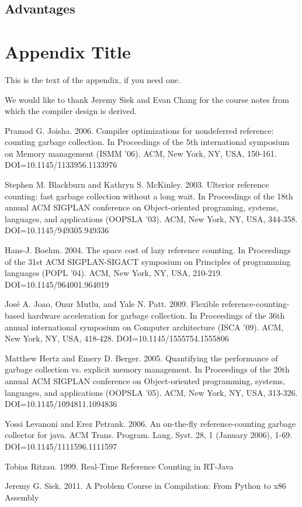 \documentclass{sigplanconf}
\begin{document}
\subsection{Advantages}

\appendix
\section{Appendix Title}

This is the text of the appendix, if you need one.

\acks

We would like to thank Jeremy Siek and Evan Chang for the course notes from which the compiler design is derived.





\begin{thebibliography}{}
\softraggedright
{}
Pramod G. Joisha. 2006. Compiler optimizations for nondeferred reference: counting garbage collection. In Proceedings of the 5th international symposium on Memory management (ISMM '06). ACM, New York, NY, USA, 150-161. DOI=10.1145/1133956.1133976

Stephen M. Blackburn and Kathryn S. McKinley. 2003. Ulterior reference counting: fast garbage collection without a long wait. In Proceedings of the 18th annual ACM SIGPLAN conference on Object-oriented programing, systems, languages, and applications (OOPSLA '03). ACM, New York, NY, USA, 344-358. DOI=10.1145/949305.949336

Hans-J. Boehm. 2004. The space cost of lazy reference counting. In Proceedings of the 31st ACM SIGPLAN-SIGACT symposium on Principles of programming languages (POPL '04). ACM, New York, NY, USA, 210-219. DOI=10.1145/964001.964019 

José A. Joao, Onur Mutlu, and Yale N. Patt. 2009. Flexible reference-counting-based hardware acceleration for garbage collection. In Proceedings of the 36th annual international symposium on Computer architecture (ISCA '09). ACM, New York, NY, USA, 418-428. DOI=10.1145/1555754.1555806

Matthew Hertz and Emery D. Berger. 2005. Quantifying the performance of garbage collection vs. explicit memory management. In Proceedings of the 20th annual ACM SIGPLAN conference on Object-oriented programming, systems, languages, and applications (OOPSLA '05). ACM, New York, NY, USA, 313-326. DOI=10.1145/1094811.1094836  

Yossi Levanoni and Erez Petrank. 2006. An on-the-fly reference-counting garbage collector for java. ACM Trans. Program. Lang. Syst. 28, 1 (January 2006), 1-69. DOI=10.1145/1111596.1111597 

Tobias Ritzau. 1999.  Real-Time Reference Counting in RT-Java

Jeremy G. Siek. 2011.  A Problem Course in Compilation: From Python to x86 Assembly

\end{thebibliography}
\end{document}
